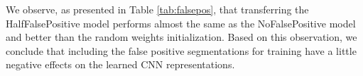 We observe, as presented in Table \ref{tab:falsepos}, that transferring the HalfFalsePositive model performs almost the same as the NoFalsePositive model and better than the random weights initialization.
Based on this observation, we conclude that including the false positive segmentations for training have a little negative effects on the learned CNN representations.


%
%
